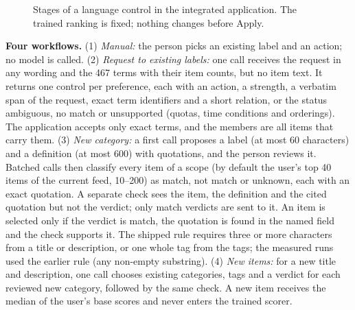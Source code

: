 \documentclass[conference]{IEEEtran}
\begin{document}
\begin{figure}[t]\centering
\newcommand{\stage}[2]{#1\vphantom{pl}\\[-1.5pt]{\fontsize{6}{7}\selectfont #2\vphantom{pl}}}
\caption{Stages of a language control in the integrated application. The trained ranking is fixed; nothing changes before Apply.}\label{fig:stages}
\end{figure}

\textbf{Four workflows.} (1) \emph{Manual:} the person picks an existing label and an action; no model is called. (2) \emph{Request to existing labels:} one call receives the request in any wording and the 467 terms with their item counts, but no item text. It returns one control per preference, each with an action, a strength, a verbatim span of the request, exact term identifiers and a short relation, or the status ambiguous, no match or unsupported (quotas, time conditions and orderings). The application accepts only exact terms, and the members are all items that carry them. (3) \emph{New category:} a first call proposes a label (at most 60 characters) and a definition (at most 600) with quotations, and the person reviews it. Batched calls then classify every item of a scope (by default the user's top 40 items of the current feed, 10--200) as match, not match or unknown, each with an exact quotation. A separate check sees the item, the definition and the cited quotation but not the verdict; only match verdicts are sent to it. An item is selected only if the verdict is match, the quotation is found in the named field and the check supports it. The shipped rule requires three or more characters from a title or description, or one whole tag from the tags; the measured runs used the earlier rule (any non-empty substring). (4) \emph{New items:} for a new title and description, one call chooses existing categories, tags and a verdict for each reviewed new category, followed by the same check. A new item receives the median of the user's base scores and never enters the trained scorer.
\end{document}
